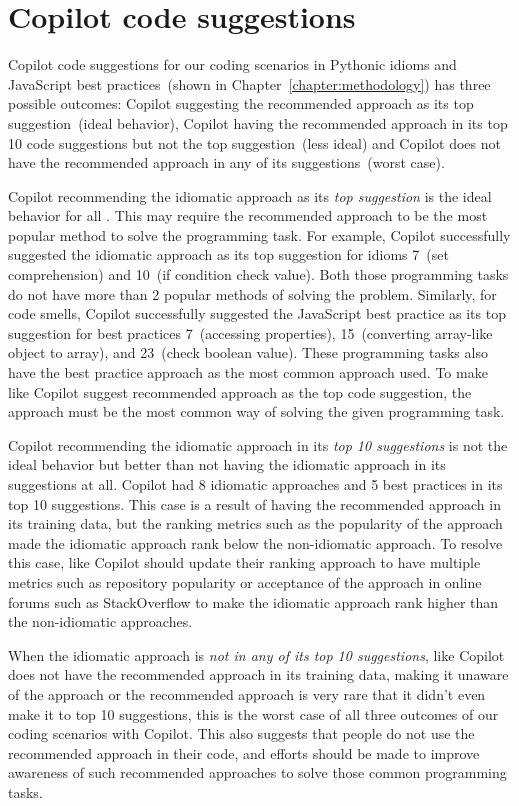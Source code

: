 \section{Copilot code suggestions}
\label{performance}
Copilot code suggestions for our coding scenarios in Pythonic idioms and JavaScript best practices~(shown in Chapter~\ref{chapter:methodology}) has three possible outcomes: Copilot suggesting the recommended approach as its top suggestion~(ideal behavior), Copilot having the recommended approach in its top 10 code suggestions but not the top suggestion~(less ideal) and Copilot does not have the recommended approach in any of its suggestions~(worst case).

Copilot recommending the idiomatic approach as its \emph{top suggestion} is the ideal behavior for all \cct{}.
This may require the recommended approach to be the most popular method to solve the programming task. For example, Copilot successfully suggested the idiomatic approach as its top suggestion for idioms 7~(set comprehension) and 10~(if condition check value). 
Both those programming tasks do not have more than 2 popular methods of solving the problem. Similarly, for code smells, Copilot successfully suggested the JavaScript best practice as its top suggestion for best practices 7~(accessing properties), 15~(converting array-like object to array), and 23~(check boolean value). These programming tasks also have the best practice approach as the most common approach used. 
To make \cct{} like Copilot suggest recommended approach as the top code suggestion, the approach must be the most common way of solving the given programming task. 

Copilot recommending the idiomatic approach in its \emph{top 10 suggestions} is not the ideal behavior but better than not having the idiomatic approach in its suggestions at all. 
Copilot had 8 idiomatic approaches and 5 best practices in its top 10 suggestions. This case is a result of \cct{} having the recommended approach in its training data, but the ranking metrics such as the popularity of the approach made the idiomatic approach rank below the non-idiomatic approach. 
To resolve this case, \cct{} like Copilot should update their ranking approach to have multiple metrics such as repository popularity or acceptance of the approach in online forums such as StackOverflow to make the idiomatic approach rank higher than the non-idiomatic approaches.

When the idiomatic approach is \emph{not in any of its top 10 suggestions}, \cct{} like Copilot does not have the recommended approach in its training data, making it unaware of the approach or the recommended approach is very rare that it didn't even make it to top 10 suggestions, this is the worst case of all three outcomes of our coding scenarios with Copilot. 
This also suggests that people do not use the recommended approach in their code, and efforts should be made to improve awareness of such recommended approaches to solve those common programming tasks.